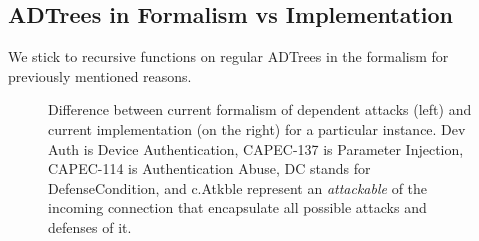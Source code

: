 \documentclass{article}
\begin{document}
	\subsection{ADTrees in Formalism vs Implementation}
	We stick to recursive functions on regular 
	ADTrees in the formalism for previously
	mentioned reasons. 
	\begin{figure}[t]
		\hspace{1cm}
		\caption{Difference between current formalism of 
		dependent attacks (left) and current 
		implementation (on the right) for a particular
		instance. Dev Auth is Device Authentication, 
		CAPEC-137 is Parameter Injection, CAPEC-114 is
		Authentication Abuse, DC stands for 
		DefenseCondition, and c.Atkble represent 
		an \textit{attackable} of the incoming
		connection that encapsulate all possible
		attacks and defenses of it.
		}
		\label{fig:dep}
	\end{figure}
\end{document}
